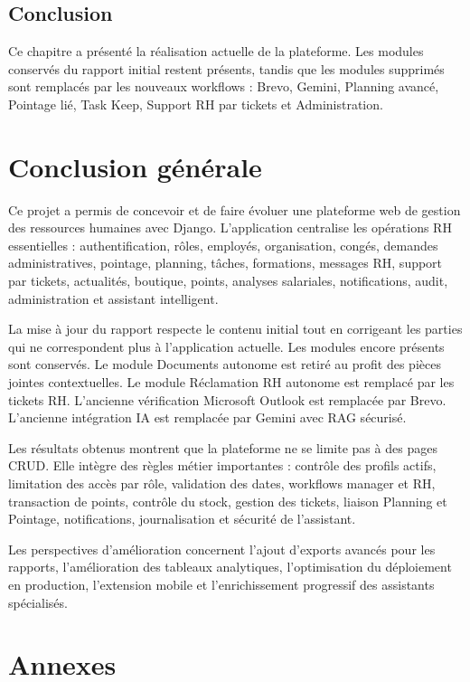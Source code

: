 \documentclass[12pt,a4paper]{report}
\begin{document}
\section{Conclusion}
Ce chapitre a présenté la réalisation actuelle de la plateforme. Les modules conservés du rapport initial restent présents, tandis que les modules supprimés sont remplacés par les nouveaux workflows : Brevo, Gemini, Planning avancé, Pointage lié, Task Keep, Support RH par tickets et Administration.

\chapter*{Conclusion générale}
Ce projet a permis de concevoir et de faire évoluer une plateforme web de gestion des ressources humaines avec Django. L'application centralise les opérations RH essentielles : authentification, rôles, employés, organisation, congés, demandes administratives, pointage, planning, tâches, formations, messages RH, support par tickets, actualités, boutique, points, analyses salariales, notifications, audit, administration et assistant intelligent.

La mise à jour du rapport respecte le contenu initial tout en corrigeant les parties qui ne correspondent plus à l'application actuelle. Les modules encore présents sont conservés. Le module Documents autonome est retiré au profit des pièces jointes contextuelles. Le module Réclamation RH autonome est remplacé par les tickets RH. L'ancienne vérification Microsoft Outlook est remplacée par Brevo. L'ancienne intégration IA est remplacée par Gemini avec RAG sécurisé.

Les résultats obtenus montrent que la plateforme ne se limite pas à des pages CRUD. Elle intègre des règles métier importantes : contrôle des profils actifs, limitation des accès par rôle, validation des dates, workflows manager et RH, transaction de points, contrôle du stock, gestion des tickets, liaison Planning et Pointage, notifications, journalisation et sécurité de l'assistant.

Les perspectives d'amélioration concernent l'ajout d'exports avancés pour les rapports, l'amélioration des tableaux analytiques, l'optimisation du déploiement en production, l'extension mobile et l'enrichissement progressif des assistants spécialisés.

\appendix
\chapter{Annexes}
\end{document}
